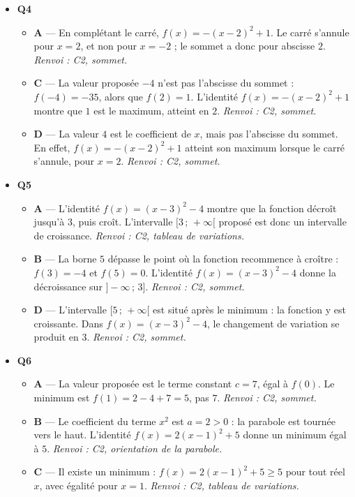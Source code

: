 \begin{itemize}
\begin{itemize}
  \end{itemize}
  \item \textbf{Q4}
  \begin{itemize}
    \item \textbf{A} — En complétant le carré, $f(x)=-(x-2)^2+1$. Le carré s’annule pour $x=2$, et non pour $x=-2$ ; le sommet a donc pour abscisse $2$. \emph{Renvoi : C2, sommet.}
    \item \textbf{C} — La valeur proposée $-4$ n’est pas l’abscisse du sommet : $f(-4)=-35$, alors que $f(2)=1$. L’identité $f(x)=-(x-2)^2+1$ montre que $1$ est le maximum, atteint en $2$. \emph{Renvoi : C2, sommet.}
    \item \textbf{D} — La valeur $4$ est le coefficient de $x$, mais pas l’abscisse du sommet. En effet, $f(x)=-(x-2)^2+1$ atteint son maximum lorsque le carré s’annule, pour $x=2$. \emph{Renvoi : C2, sommet.}
  \end{itemize}
  \item \textbf{Q5}
  \begin{itemize}
    \item \textbf{A} — L’identité $f(x)=(x-3)^2-4$ montre que la fonction décroît jusqu’à $3$, puis croît. L’intervalle $[3\,;\,+\infty[$ proposé est donc un intervalle de croissance. \emph{Renvoi : C2, tableau de variations.}
    \item \textbf{B} — La borne $5$ dépasse le point où la fonction recommence à croître : $f(3)=-4$ et $f(5)=0$. L’identité $f(x)=(x-3)^2-4$ donne la décroissance sur $]-\infty\,;\,3]$. \emph{Renvoi : C2, sommet.}
    \item \textbf{D} — L’intervalle $[5\,;\,+\infty[$ est situé après le minimum : la fonction y est croissante. Dans $f(x)=(x-3)^2-4$, le changement de variation se produit en $3$. \emph{Renvoi : C2, sommet.}
  \end{itemize}
  \item \textbf{Q6}
  \begin{itemize}
    \item \textbf{A} — La valeur proposée est le terme constant $c=7$, égal à $f(0)$. Le minimum est $f(1)=2-4+7=5$, pas $7$. \emph{Renvoi : C2, sommet.}
    \item \textbf{B} — Le coefficient du terme $x^2$ est $a=2>0$ : la parabole est tournée vers le haut. L’identité $f(x)=2(x-1)^2+5$ donne un minimum égal à $5$. \emph{Renvoi : C2, orientation de la parabole.}
    \item \textbf{C} — Il existe un minimum : $f(x)=2(x-1)^2+5\geq5$ pour tout réel $x$, avec égalité pour $x=1$. \emph{Renvoi : C2, tableau de variations.}

\end{itemize}
\end{itemize}
